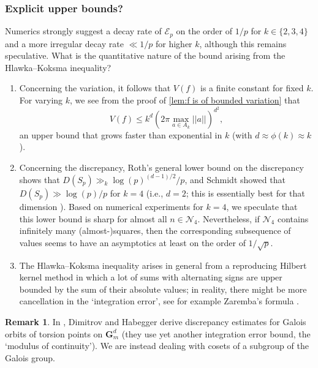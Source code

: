 \documentclass[12pt,reqno]{amsart}
\theoremstyle{definition}
\theoremstyle{plain}
\theoremstyle{definition}
\newtheorem{remark}[theorem]{Remark}
\newcommand{\Gm}{\mathbf{G}_m}
\newcommand{\err}{\mathcal{E}}
\renewcommand{\leq}{\leqslant}
\begin{document}
\subsubsection*{Explicit upper bounds?} Numerics strongly suggest a decay rate of $\err_p$ on the order of $1/p$ for $k\in \{2,3,4\}$ and a more irregular decay rate $\ll 1/p$ for higher $k$, although this remains speculative.
What is the quantitative nature of the bound arising from the Hlawka--Koksma inequality? 
\begin{enumerate} 
\item Concerning the variation, it follows that $V(f)$ is a finite constant for fixed $k$. For varying $k$, we see from the proof of 
\ref{lem:f is of bounded variation} that 
\begin{equation} \label{upperVbad} V(f) \leq k^d (2 \pi \max_{a \in A_k} ||a||)^{d^2}, \end{equation} 
an upper bound that grows faster than exponential in $k$ (with $d \approx \phi(k) \approx k$). 
\item Concerning the discrepancy, Roth's general lower bound on the discrepancy \cite[Theorem~2.24]{Leobacher-et-al} shows that $D(S_p)\gg_k \log(p)^{(d-1)/2}/p$, and Schmidt showed that $D(S_p) \gg \log(p)/p$ for $k=4$ (i.e., $d=2$; this is essentially best for that dimension \cite[Theorem~2.25]{Leobacher-et-al}). Based on numerical experiments for $k=4$, we speculate that this lower bound is sharp for almost all $n \in \mathcal{N}_4$. Nevertheless, if $\mathcal{N}_4$ contains infinitely many (almost-)squares, then the corresponding subsequence of values seems to have an asymptotics at least on the order of $1/\sqrt{p}$. 
\item The Hlawka--Koksma inequality arises in general from a reproducing Hilbert kernel method in which a lot of sums with alternating signs are upper bounded by the sum of their absolute values;  in reality, there might be more cancellation in the `integration error', see for example Zaremba's formula \cite[Thm. 3.10]{Leobacher-et-al}.
\end{enumerate} 



\begin{remark} 
In \cite{DimitrovHabegger}, Dimitrov and Habegger derive discrepancy estimates for Galois orbits of torsion points on $\Gm^d$ (they use yet another integration error bound, the `modulus of continuity'). We are instead dealing with cosets of a subgroup of the Galois group. 
\end{remark} 
\end{document}
